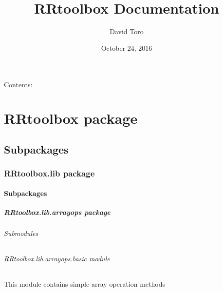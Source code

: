 \documentclass[letterpaper,10pt,english]{sphinxmanual}
\title{RRtoolbox Documentation}
\date{October 24, 2016}
\author{David Toro}
\begin{document}
\maketitle
\tableofcontents
{}\label{index::doc}


Contents:


\chapter{RRtoolbox package}
\label{RRtoolbox::doc}\label{RRtoolbox:welcome-to-rrtoolbox-s-documentation}\label{RRtoolbox:rrtoolbox-package}

\section{Subpackages}
\label{RRtoolbox:subpackages}

\subsection{RRtoolbox.lib package}
\label{RRtoolbox.lib:rrtoolbox-lib-package}\label{RRtoolbox.lib::doc}

\subsubsection{Subpackages}
\label{RRtoolbox.lib:subpackages}

\paragraph{RRtoolbox.lib.arrayops package}
\label{RRtoolbox.lib.arrayops:rrtoolbox-lib-arrayops-package}\label{RRtoolbox.lib.arrayops::doc}

\subparagraph{Submodules}
\label{RRtoolbox.lib.arrayops:submodules}

\subparagraph{RRtoolbox.lib.arrayops.basic module}
\label{RRtoolbox.lib.arrayops:rrtoolbox-lib-arrayops-basic-module}\label{RRtoolbox.lib.arrayops:module-RRtoolbox.lib.arrayops.basic}
This module contains simple array operation methods
\end{document}

